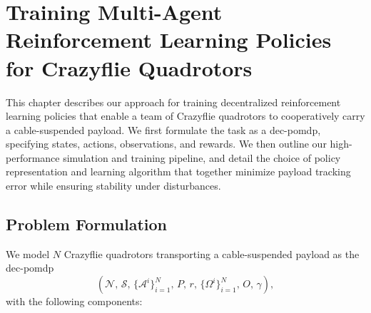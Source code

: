 \chapter{Training Multi-Agent Reinforcement Learning Policies for Crazyflie Quadrotors}
This chapter describes our approach for training decentralized reinforcement learning policies that enable a team of Crazyflie quadrotors to cooperatively carry a cable-suspended payload. We first formulate the task as a \gls{dec-pomdp}, specifying states, actions, observations, and rewards. We then outline our high-performance simulation and training pipeline, and detail the choice of policy representation and learning algorithm that together minimize payload tracking error while ensuring stability under disturbances.

\section{Problem Formulation}

We model \(N\) Crazyflie quadrotors transporting a cable-suspended payload as the \gls{dec-pomdp}
\[
(\mathcal{N},\,\mathcal{S},\,\{\mathcal{A}^i\}_{i=1}^N,\,P,\,r,\,\{\Omega^i\}_{i=1}^N,\,O,\,\gamma),
\]
with the following components:

